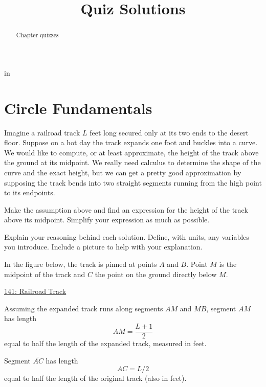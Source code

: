 \documentclass{ximera}
\title{Quiz Solutions}
\newcommand{\pskip}{\vskip 0.1 in}
\begin{document}
\begin{abstract}
Chapter quizzes
\end{abstract}
\maketitle


\pskip

\section*{Circle Fundamentals}


\begin{question}  \label{Q:9444433331350}
Imagine a railroad track $L$ feet long secured only at its two ends to the desert floor. Suppose on a hot day the track expands one foot and buckles into a curve. We would like to compute, or at least approximate, the height of the track above the ground at its midpoint. We really need calculus to determine the shape of the curve and the exact height, but we can get a pretty good approximation by supposing the track bends into two straight segments running from the high point to its endpoints.

Make the assumption above and find an expression for the height of the track above its midpoint. Simplify your expression as much as possible. 

Explain your reasoning behind each solution. Define, with units, any variables you introduce. Include a picture to help with your explanation.

\begin{explanation}
In the figure below, the track is pinned at points $A$ and $B$. Point $M$ is the midpoint of the track and $C$ the point on the ground directly below $M$.

\begin{onlineOnly}
    \begin{center}
\end{center}
\end{onlineOnly}

\href{https://www.desmos.com/calculator/vhuz17uwsa}{141: Railroad Track}


Assuming the expanded track runs along segments $\overline{AM}$ and $\overline{MB}$,  segment $\overline{AM}$ has length
\[
   AM = \frac{L+1}{2}
\]
equal to half the length of the expanded track, measured in feet.

Segment $\overline{AC}$ has length
\[
  AC = L/2
\]
equal to half the length of the original track (also in feet). 


\end{explanation}
\end{question}
\end{document}
